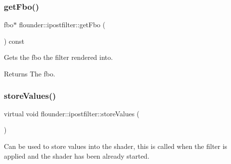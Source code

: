 \subsubsection{\texorpdfstring{get\+Fbo()}{getFbo()}}
{\footnotesize\ttfamily fbo$\ast$ flounder\+::ipostfilter\+::get\+Fbo (\begin{DoxyParamCaption}{ }\end{DoxyParamCaption}) const\hspace{0.3cm}{\ttfamily [inline]}}



Gets the fbo the filter rendered into. 

\begin{DoxyReturn}{Returns}
The fbo. 
\end{DoxyReturn}
\mbox{\label{classflounder_1_1ipostfilter_a9b658b4672718d5ac36539875bde722e}} 
\subsubsection{\texorpdfstring{store\+Values()}{storeValues()}}
{\footnotesize\ttfamily virtual void flounder\+::ipostfilter\+::store\+Values (\begin{DoxyParamCaption}{ }\end{DoxyParamCaption})\hspace{0.3cm}{\ttfamily [pure virtual]}}



Can be used to store values into the shader, this is called when the filter is applied and the shader has been already started. 



